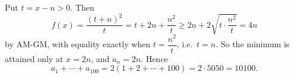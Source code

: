 Put $t=x-n>0$. Then
\[
f(x)=\dfrac{(t+n)^2}{t}=t+2n+\dfrac{n^2}{t}\ge2n+2\sqrt{t\cdot\dfrac{n^2}{t}}=4n
\]
by AM-GM, with equality exactly when $t=\dfrac{n^2}{t}$, i.e.\ $t=n$. So the minimum is attained only at $x=2n$, and $a_n=2n$. Hence
\[
a_1+\cdots+a_{100}=2(1+2+\cdots+100)=2\cdot5050=\boxed{10100}.
\]
